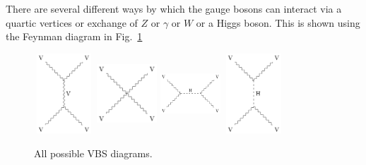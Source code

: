 There are several different ways by which the gauge bosons can interact via a quartic vertices or exchange of $Z$ or $\gamma$ or $W$ or a Higgs boson. This is shown using the Feynman diagram in Fig.~\ref{fig:VBF_vv_all}
\begin{figure}[!htbp]
    \centering
    \includegraphics[width=0.20\textwidth,height=3cm]{figures/Intro/VV_Scattering_diagrams_1.png}%
    \includegraphics[width=0.20\textwidth,height=3cm]{figures/Intro/VV_Scattering_diagrams_2.png}%
    \includegraphics[width=0.20\textwidth,height=3cm]{figures/Intro/VV_Scattering_diagrams_4.png}%
    \includegraphics[width=0.20\textwidth,height=3cm]{figures/Intro/VV_Scattering_diagrams_5.png}
    \caption{All possible VBS diagrams.}
    \label{fig:VBF_vv_all}
\end{figure}

